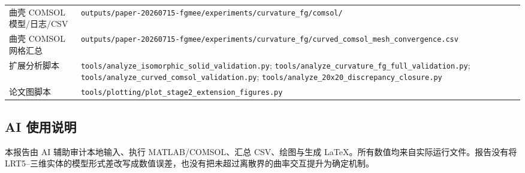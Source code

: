 \documentclass[UTF8,fontset=windows,11pt,a4paper]{ctexart}
\begin{document}
\begin{longtable}{>{\raggedright\arraybackslash}p{}>{\raggedright\arraybackslash}p{}}
曲壳 COMSOL 模型/日志/CSV & \nolinkurl{outputs/paper-20260715-fgmee/experiments/curvature_fg/comsol/} \\
曲壳 COMSOL 网格汇总 & \nolinkurl{outputs/paper-20260715-fgmee/experiments/curvature_fg/curved_comsol_mesh_convergence.csv} \\
扩展分析脚本 & \nolinkurl{tools/analyze_isomorphic_solid_validation.py}; \nolinkurl{tools/analyze_curvature_fg_full_validation.py}; \nolinkurl{tools/analyze_curved_comsol_validation.py}; \nolinkurl{tools/analyze_20x20_discrepancy_closure.py} \\
论文图脚本 & \nolinkurl{tools/plotting/plot_stage2_extension_figures.py} \\
\bottomrule
\end{longtable}

\subsection*{AI 使用说明}
本报告由 AI 辅助审计本地输入、执行 MATLAB/COMSOL、汇总 CSV、绘图与生成 LaTeX。所有数值均来自实际运行文件。报告没有将 LRT5--三维实体的模型形式差改写成数值误差，也没有把未超过离散界的曲率交互提升为确定机制。
\end{document}
